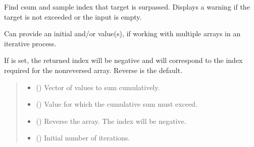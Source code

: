 \documentclass[letterpaper,10pt,english]{sphinxmanual}
\begin{document}

\begin{fulllineitems}
\label{\detokenize{misc:glomar_gridding.covariance_tools.csum_up_to_val}}
\pysigstartsignatures
\pysiglinewithargsret
{}
{\sphinxparamcomma {}\sphinxparamcomma {}\sphinxparamcomma {}\sphinxparamcomma {}}
{}
\pysigstopsignatures
\sphinxAtStartPar
Find csum and sample index that target is surpassed. Displays a warning if
the target is not exceeded or the input  is empty.

\sphinxAtStartPar
Can provide an initial  and/or  value(s), if working with
multiple arrays in an iterative process.

\sphinxAtStartPar
If  is set, the returned index will be negative and will correspond
to the index required for the non\sphinxhyphen{}reversed array. Reverse is the default.
\begin{quote}\begin{description}
\begin{itemize}
\item {}
\sphinxAtStartPar
{} () \textendash{} Vector of values to sum cumulatively.

\item {}
\sphinxAtStartPar
{} () \textendash{} Value for which the cumulative sum must exceed.

\item {}
\sphinxAtStartPar
{} () \textendash{} Reverse the array. The index will be negative.

\item {}
\sphinxAtStartPar
{} () \textendash{} Initial number of iterations.


\end{itemize}
\end{description}
\end{quote}
\end{fulllineitems}
\end{document}
